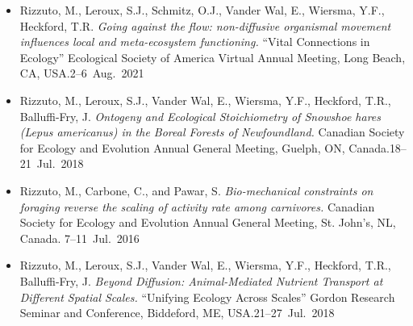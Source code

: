 


\begin{itemize}
  \item \textcolor{awesome}{Rizzuto, M.}, Leroux, S.J., Schmitz, O.J., Vander Wal, E., Wiersma, Y.F., Heckford, T.R. \emph{Going against the flow: non-diffusive organismal movement influences local and meta-ecosystem functioning.} ``Vital Connections in Ecology'' Ecological Society of America Virtual Annual Meeting, Long Beach, CA, USA.\hfill 2--6~Aug.~2021
  \item \textcolor{awesome}{Rizzuto, M.}, Leroux, S.J., Vander Wal, E., Wiersma, Y.F., Heckford, T.R., Balluffi-Fry, J. \emph{Ontogeny and Ecological Stoichiometry of Snowshoe hares (Lepus americanus) in the Boreal Forests of Newfoundland.} Canadian Society for Ecology and Evolution Annual General Meeting, Guelph, ON, Canada.\hfill 18--21~Jul.~2018 
  \item \textcolor{awesome}{Rizzuto, M.}, Carbone, C., and Pawar, S. \emph{Bio-mechanical constraints on foraging reverse the scaling of activity rate among carnivores.} Canadian Society for Ecology and Evolution Annual General Meeting, St. John's, NL,\\ Canada. \hfill 7--11~Jul.~2016
\end{itemize}


\begin{itemize}
  \item \textcolor{awesome}{Rizzuto, M.}, Leroux, S.J., Vander Wal, E., Wiersma, Y.F., Heckford, T.R., Balluffi-Fry, J. \emph{Beyond Diffusion: Animal-Mediated Nutrient Transport at Different Spatial Scales.} ``Unifying Ecology Across Scales'' Gordon Research Seminar and Conference, Biddeford, ME, USA.\hfill 21--27~Jul.~2018
\end{itemize}



